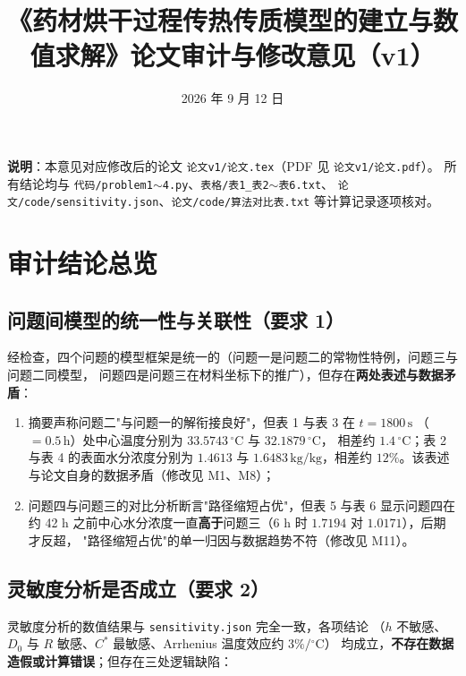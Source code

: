 \documentclass[UTF8,zihao=-4]{ctexart}
\title{\heiti 《药材烘干过程传热传质模型的建立与数值求解》论文审计与修改意见（v1）}
\author{}
\date{2026 年 9 月 12 日}
\begin{document}
\maketitle

\begin{center}
\textbf{说明}：本意见对应修改后的论文 \texttt{论文v1/论文.tex}（PDF 见 \texttt{论文v1/论文.pdf}）。
所有结论均与 \texttt{代码/problem1$\sim$4.py}、\texttt{表格/表1\_表2$\sim$表6.txt}、
\texttt{论文/code/sensitivity.json}、\texttt{论文/code/算法对比表.txt} 等计算记录逐项核对。
\end{center}

\section{审计结论总览}

\subsection{问题间模型的统一性与关联性（要求 1）}

经检查，四个问题的模型框架是统一的（问题一是问题二的常物性特例，问题三与问题二同模型，
问题四是问题三在材料坐标下的推广），但存在\textbf{两处表述与数据矛盾}：

\begin{enumerate}
\item 摘要声称问题二"与问题一的解衔接良好"，但表 1 与表 3 在 $t=1800\,\mathrm{s}$
（$=0.5\,\mathrm{h}$）处中心温度分别为 $33.5743\,{}^\circ$C 与 $32.1879\,{}^\circ$C，
相差约 $1.4\,{}^\circ$C；表 2 与表 4 的表面水分浓度分别为 $1.4613$ 与
$1.6483\,\mathrm{kg/kg}$，相差约 $12\%$。该表述与论文自身的数据矛盾（修改见 M1、M8）；
\item 问题四与问题三的对比分析断言"路径缩短占优"，但表 5 与表 6 显示问题四在约 42 h
之前中心水分浓度一直\textbf{高于}问题三（6 h 时 $1.7194$ 对 $1.0171$），后期才反超，
"路径缩短占优"的单一归因与数据趋势不符（修改见 M11）。
\end{enumerate}

\subsection{灵敏度分析是否成立（要求 2）}

灵敏度分析的数值结果与 \texttt{sensitivity.json} 完全一致，各项结论
（$h$ 不敏感、$D_0$ 与 $R$ 敏感、$C^{*}$ 最敏感、Arrhenius 温度效应约 $3\%/{}^\circ$C）
均成立，\textbf{不存在数据造假或计算错误}；但存在三处逻辑缺陷：
\end{document}
